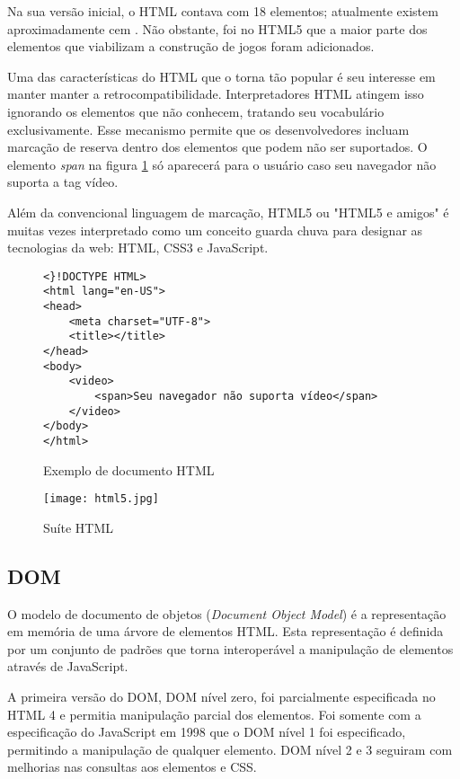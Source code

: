 Na sua versão inicial, o HTML contava com 18 elementos;
atualmente existem aproximadamente cem \autocite{diveIntohtml}.
Não obstante, foi no HTML5 que a maior parte dos elementos
que viabilizam a construção de jogos foram adicionados.

Uma das características do HTML que o torna tão popular
é seu interesse em manter manter a retrocompatibilidade.
Interpretadores HTML atingem isso ignorando os elementos que não
conhecem, tratando seu vocabulário exclusivamente. Esse mecanismo
permite que os desenvolvedores incluam marcação de reserva dentro
dos elementos que podem não ser suportados. O elemento \textit{span}
na figura \ref{fig:htmlSample} só aparecerá para o usuário caso seu
navegador não suporta a tag vídeo.

Além da convencional linguagem de marcação, HTML5 ou "HTML5 e amigos"
é muitas vezes interpretado como um conceito guarda chuva para designar
as tecnologias da web: HTML, CSS3 e JavaScript.


\begin{figure}
\centering
\begin{verbatim}
<}!DOCTYPE HTML>
<html lang="en-US">
<head>
	<meta charset="UTF-8">
	<title></title>
</head>
<body>
    <video>
        <span>Seu navegador não suporta vídeo</span>
    </video>
</body>
</html>
\end{verbatim}
\caption{Exemplo de documento HTML}
\label{fig:htmlSample}
\end{figure}

\begin{figure}
    \centering
    \texttt{[image: html5.jpg]}
    \caption{Suíte HTML}
\end{figure}
\subsection{DOM}

O modelo de documento de objetos (\textit{Document Object Model}) é a representação
em memória de uma árvore de elementos HTML. Esta representação é definida por
um conjunto de padrões que torna interoperável a manipulação de elementos através de
JavaScript.

A primeira versão do DOM, DOM nível zero, foi parcialmente
especificada no HTML 4 e permitia manipulação parcial dos elementos.
Foi somente com a especificação do JavaScript em 1998 que o DOM nível 1 foi especificado,
permitindo a manipulação de qualquer elemento. DOM nível 2 e 3 seguiram com melhorias nas
consultas aos elementos e CSS.

